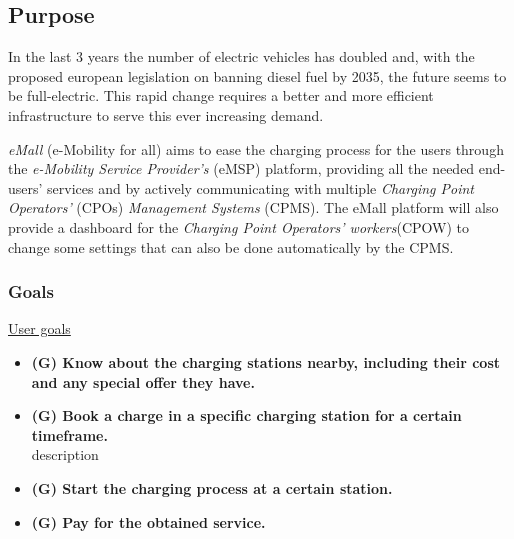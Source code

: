 \documentclass[table, 12pt]{article} %
\begin{document}
    \subsection{Purpose} %

         
        In the last 3 years the number of electric vehicles has doubled and, with the proposed european legislation on banning diesel fuel by 2035, the future seems to be full-electric. This rapid change requires a better and more efficient infrastructure to serve this ever increasing demand.

        

        \emph{eMall} (e-Mobility for all) aims to ease the charging process for the users through the \emph{e-Mobility Service Provider's} (eMSP) platform,
        providing all the needed end-users' services and by actively communicating with multiple \emph{Charging Point Operators'} (CPOs) \emph{Management Systems} (CPMS).
        The eMall platform will also provide a dashboard for the \emph{Charging Point Operators' workers}(CPOW) to change some settings that can also be done automatically by the CPMS.

    \subsubsection{Goals}
        \underline{User goals}
        \begin{itemize}
            \item  \textbf{(G) Know about the charging stations nearby, including their cost and any special offer they have.}
            \item  \textbf{(G) Book a charge in a specific charging station for a certain timeframe.}\\ description
            \item  \textbf{(G) Start the charging process at a certain station.}
            \item  \textbf{(G) Pay for the obtained service.}
        \end{itemize}
        
\end{document}
